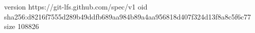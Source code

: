 version https://git-lfs.github.com/spec/v1
oid sha256:d8216f7555d289b49ddfb689aa984b89a4aa956818d407f324d13f8a8c5f6c77
size 108826
